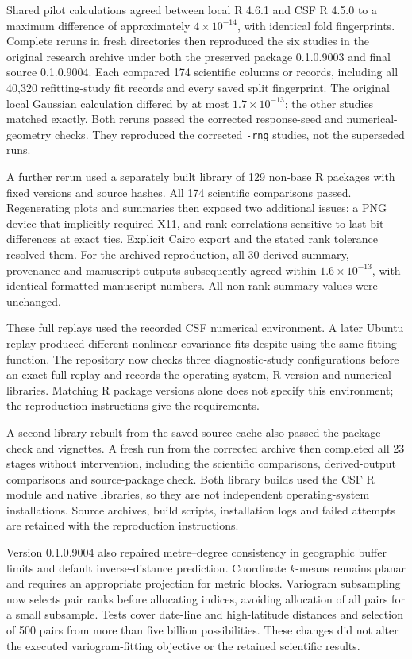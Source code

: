 \documentclass[11pt,a4paper]{article}
\begin{document}
Shared pilot calculations agreed between local R 4.6.1 and CSF R 4.5.0 to a maximum difference of approximately $4\times10^{-14}$, with identical fold fingerprints. Complete reruns in fresh directories then reproduced the six studies in the original research archive under both the preserved package 0.1.0.9003 and final source 0.1.0.9004. Each compared 174 scientific columns or records, including all 40,320 refitting-study fit records and every saved split fingerprint. The original local Gaussian calculation differed by at most $1.7\times10^{-13}$; the other studies matched exactly. Both reruns passed the corrected response-seed and numerical-geometry checks. They reproduced the corrected \texttt{-rng} studies, not the superseded runs.

A further rerun used a separately built library of 129 non-base R packages with fixed versions and source hashes. All 174 scientific comparisons passed. Regenerating plots and summaries then exposed two additional issues: a PNG device that implicitly required X11, and rank correlations sensitive to last-bit differences at exact ties. Explicit Cairo export and the stated rank tolerance resolved them. For the archived reproduction, all 30 derived summary, provenance and manuscript outputs subsequently agreed within $1.6\times10^{-13}$, with identical formatted manuscript numbers. All non-rank summary values were unchanged.

These full replays used the recorded CSF numerical environment. A later Ubuntu replay produced different nonlinear covariance fits despite using the same fitting function. The repository now checks three diagnostic-study configurations before an exact full replay and records the operating system, R version and numerical libraries. Matching R package versions alone does not specify this environment; the reproduction instructions give the requirements.

A second library rebuilt from the saved source cache also passed the package check and vignettes. A fresh run from the corrected archive then completed all 23 stages without intervention, including the scientific comparisons, derived-output comparisons and source-package check. Both library builds used the CSF R module and native libraries, so they are not independent operating-system installations. Source archives, build scripts, installation logs and failed attempts are retained with the reproduction instructions.

Version 0.1.0.9004 also repaired metre--degree consistency in geographic buffer limits and default inverse-distance prediction. Coordinate $k$-means remains planar and requires an appropriate projection for metric blocks. Variogram subsampling now selects pair ranks before allocating indices, avoiding allocation of all pairs for a small subsample. Tests cover date-line and high-latitude distances and selection of 500 pairs from more than five billion possibilities. These changes did not alter the executed variogram-fitting objective or the retained scientific results.
\end{document}
